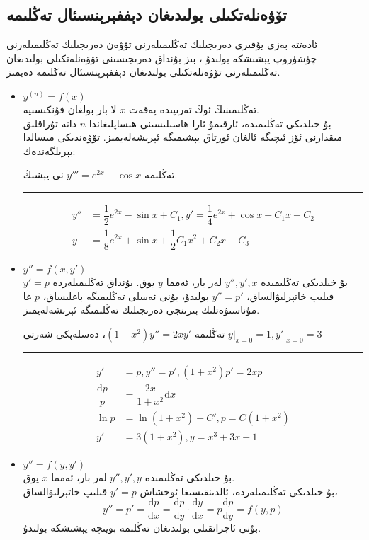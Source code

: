 \subsection{تۆۋەنلەتكىلى بولىدىغان دېففېرېنسىئال تەڭلىمە}
 ئادەتتە بەزى يۇقىرى دەرىجىلىك تەڭلىمىلەرنى تۆۋەن دەرىجىلىك تەڭلىمىلەرنى چۈشۈرۈپ يېشىشكە بولىدۇ ،  بىز بۇنداق دەرىجىسىنى تۆۋەنلەتكىلى بولىدىغان تەڭلىمىلەرنى تۆۋەنلەتكىلى بولىدىغان دېففېرېنسىئال تەڭلىمە دەيمىز.
\begin{itemize}
\item[\faIcon{hand-point-left}] $y^{(n)}=f(x)$\\
تەڭلىمىنىڭ ئوڭ تەرىپىدە پەقەت $x$ لا بار بولغان فۇنكىسىيە.\\
بۇ خىلدىكى تەڭلىمىدە، ئارقىمۇ-ئارا ھاسىلىسىنى ھىساپلىغاندا $n$ دانە تۇراقلىق مىقدارنى ئۆز ئىچىگە ئالغان ئورتاق يېشىمىگە ئېرىشەلەيمىز. تۆۋەندىكى مىسالدا بېرىلگەندەك:
\begin{myexample}
	تەڭلىمە $y'''=e^{2x}-\cos x$ نى يېشىڭ.
	\\\rule{\linewidth}{0.05em}
	\begin{align*}
	y''&=\dfrac{1}{2}e^{2x}-\sin x+C_1, y'=\dfrac{1}{4}e^{2x}+\cos x+C_1x+C_2\\
	y&=\dfrac{1}{8}e^{2x}+\sin x+\dfrac{1}{2}C_1x^2+C_2x+C_3
	\end{align*}
\end{myexample}

\item[\faIcon{hand-point-left}] $y''=f(x,y')$\\
بۇ خىلدىكى تەڭلىمىدە $y'',y',x$ لەر بار، ئەمما $y$ يوق. بۇنداق تەڭلىمىلەردە $y'=p$ قىلىپ خاتېرلىۋالساق، $y''=p'$ بولىدۇ، بۇنى ئەسلى تەڭلىمىگە باغلىساق، $p$ غا مۇناسىۋەتلىك بىرىنجى دەرىجىلىك تەڭلىمىگە ئېرىشەلەيمىز.

\begin{myexample}
	تەڭلىمە $(1+x^2)y''=2xy'$، دەسلەپكى شەرتى 
	$y\vert_{x=0}=1,y'\vert_{x=0}=3$
	\\\rule{\linewidth}{0.05em}
\begin{align*}
	y'&=p, y''=p', (1+x^2)p'=2xp\\
	\dfrac{\textrm{d}p}{p}&=\dfrac{2x}{1+x^2}\textrm{d}x\\
	\ln p&=\ln(1+x^2)+C', p=C(1+x^2)\\
	y'&=3(1+x^2), y=x^3+3x+1
\end{align*}

\end{myexample}

\item[\faIcon{hand-point-left}] $y''=f(y,y')$\\
بۇ خىلدىكى تەڭلىمىدە $y'',y',y$ لەر بار، ئەمما $x$ يوق.\\
بۇ خىلدىكى تەڭلىمىلەردە، ئالدىنقىسىغا ئوخشاش $y'=p$ قىلىپ خاتېرلىۋالساق، 
$$y''=p'=\dfrac{\textrm{d}p}{\textrm{d}x}=\dfrac{\textrm{d}p}{\textrm{d}y}\cdot\dfrac{\textrm{d}y}{\textrm{d}x}=p\dfrac{\textrm{d}p}{\textrm{d}y}=f(y,p)$$
بۇنى ئاجراتقىلى بولىدىغان تەڭلىمە بويىچە يېشىشكە بولىدۇ.

\end{itemize}


